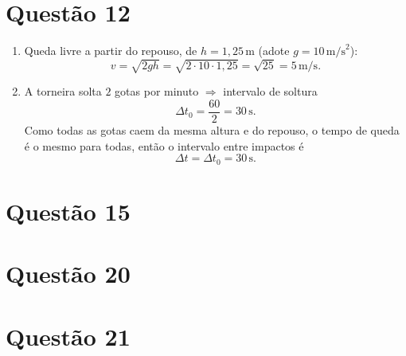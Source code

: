 \documentclass[12pt]{article}
\begin{document}
\clearpage

\section{Questão 12}
\begin{enumerate}
	\item[(a)] Queda livre a partir do repouso, de \(h=1{,}25\,\text{m}\) (adote \(g=10\,\text{m/s}^2\)):
	      \[
		      v=\sqrt{2gh}=\sqrt{2\cdot 10\cdot 1{,}25}=\sqrt{25}= \boxed{5\,\text{m/s}}.
	      \]

	\item[(b)] A torneira solta \(2\) gotas por minuto \(\Rightarrow\) intervalo de soltura
	      \[
		      \Delta t_0=\frac{60}{2}=30\,\text{s}.
	      \]
	      Como todas as gotas caem da mesma altura e do repouso, o tempo de queda é o mesmo para todas, então o intervalo entre impactos é
	      \[
		      \boxed{\Delta t=\Delta t_0=30\,\text{s}}.
	      \]
\end{enumerate}

\clearpage

\section{Questão 15}

\clearpage

\section{Questão 20}

\clearpage

\section{Questão 21}
\end{document}
